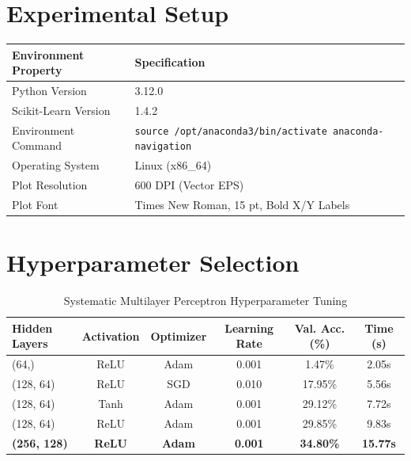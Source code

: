 \documentclass[12pt,a4paper]{article}
\begin{document}
\section{Experimental Setup}
\begin{table}[H]
\centering
\begin{tabular}{ll}
\toprule
\textbf{Environment Property} & \textbf{Specification} \\
\midrule
Python Version & 3.12.0 \\
Scikit-Learn Version & 1.4.2 \\
Environment Command & \texttt{source /opt/anaconda3/bin/activate anaconda-navigation} \\
Operating System & Linux (x86\_64) \\
Plot Resolution & 600 DPI (Vector EPS) \\
Plot Font & Times New Roman, 15 pt, Bold X/Y Labels \\
\bottomrule
\end{tabular}
\end{table}

\section{Hyperparameter Selection}
\begin{table}[H]
\centering
\caption{Systematic Multilayer Perceptron Hyperparameter Tuning}
\label{tab:tuning}
\begin{tabular}{|l|c|c|c|c|c|}
\hline
\textbf{Hidden Layers} & \textbf{Activation} & \textbf{Optimizer} & \textbf{Learning Rate} & \textbf{Val. Acc. (\%)} & \textbf{Time (s)} \\ \hline
(64,) & ReLU & Adam & 0.001 & 1.47\% & 2.05s \\ \hline
(128, 64) & ReLU & SGD & 0.010 & 17.95\% & 5.56s \\ \hline
(128, 64) & Tanh & Adam & 0.001 & 29.12\% & 7.72s \\ \hline
(128, 64) & ReLU & Adam & 0.001 & 29.85\% & 9.83s \\ \hline
\textbf{(256, 128)} & \textbf{ReLU} & \textbf{Adam} & \textbf{0.001} & \textbf{34.80\%} & \textbf{15.77s} \\ \hline
\end{tabular}
\end{table}
\end{document}
